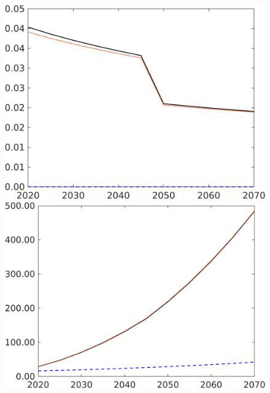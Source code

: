 \begin{figure}[h!!]
\begin{minipage}[]{0.32\textwidth}
	\end{minipage}
	\begin{minipage}[]{0.32\textwidth}
		\includegraphics[width=1\textwidth]{../../codding_model/own_basedOnFried/optimalPol_190722_tidiedUp/figures/all_10Aout22/CountMod1_target_sff_regime3_spillover0_sep1_extern0_etaa0.79_lgd0.png}
	\end{minipage}
	\begin{minipage}[]{0.32\textwidth}
		\includegraphics[width=1\textwidth]{../../codding_model/own_basedOnFried/optimalPol_190722_tidiedUp/figures/all_10Aout22/CountMod1_target_Ag_regime3_spillover0_sep1_extern0_etaa0.79_lgd0.png}

\end{minipage}
\end{figure}
